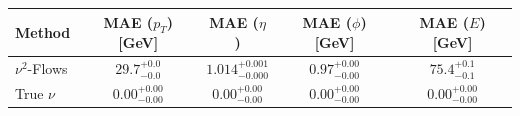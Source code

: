     \begin{tabular}{lcccc}
        \toprule
        Method & MAE ($p_T$) [GeV] & MAE ($\eta$) & MAE ($\phi$) [GeV] & MAE ($E$) [GeV] \\
        \midrule
        $\nu^2$-Flows & $29.7_{-0.0}^{+0.0}$ & $1.014_{-0.000}^{+0.001}$ & $0.97_{-0.00}^{+0.00}$ & $75.4_{-0.1}^{+0.1}$ \\
        True $\nu$ & $0.00_{-0.00}^{+0.00}$ & $0.00_{-0.00}^{+0.00}$ & $0.00_{-0.00}^{+0.00}$ & $0.00_{-0.00}^{+0.00}$ \\
        \bottomrule
    \end{tabular}
